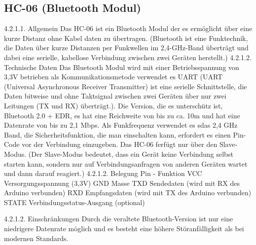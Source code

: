 \subsection{HC-06 (Bluetooth Modul)}
%
4.2.1.1. Allgemein
Das HC-06 ist ein Bluetooth Modul der es ermöglicht über eine kurze Distanz ohne Kabel daten zu übertragen. (Bluetooth ist eine Funktechnik, die Daten über kurze Distanzen per Funkwellen im 2,4-GHz-Band überträgt und dabei eine serielle, kabellose Verbindung zwischen zwei Geräten herstellt.)
4.2.1.2. Technische Daten
Das Bluetooth Modul wird mit einer Betriebsspannung von 3,3V betrieben als Kommunikationsmetode verwendet es UART (UART (Universal Asynchronous Receiver Transmitter) ist eine serielle Schnittstelle, die Daten bitweise und ohne Taktsignal zwischen zwei Geräten über nur zwei Leitungen (TX und RX) überträgt.).  Die Version, die es unterschütz ist, Bluetooth 2.0 + EDR, es hat eine Reichweite von bis zu ca.  10m und hat eine Datenrate von bis zu 2,1 Mbps. Als Funkfrequenz verwendet es sdas 2,4 GHz Band, die Sicherheitsfunktion, die man einschalten kann, erfordert es einen Pin-Code vor der Verbindung einzugeben. Das HC-06 ferfügt nur über den Slave-Modus. (Der Slave-Modus bedeutet, dass ein Gerät keine Verbindung selbst starten kann, sondern nur auf Verbindungsanfragen von anderen Geräten wartet und dann darauf reagiert.)
4.2.1.2. Belegung
Pin	-	Funktion
VCC	Versorgungsspannung (3,3V)
GND	Masse
TXD	Sendedaten (wird mit RX des Arduino verbunden)
RXD	Empfangsdaten (wird mit TX des Arduino verbunden)
STATE	Verbindungsstatus-Ausgang (optional)

4.2.1.2. Einschränkungen
Durch die veraltete Bluetooth-Version ist nur eine niedrigere Datenrate möglich und es besteht eine höhere Störanfälligkeit als bei modernen Standards.
%
